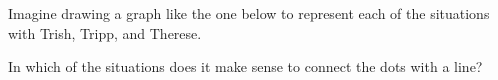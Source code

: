 \documentclass[nooutcomes]{ximera}
\begin{document}
\begin{problem}
Imagine drawing a graph like the one below to represent each of the situations with Trish, Tripp, and Therese.

\begin{center}
\end{center}

In which of the situations does it make sense to connect the dots with a line?
\begin{selectAll}
\end{selectAll}




\end{problem}
\end{document}
